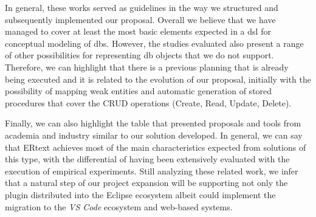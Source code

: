 In general, these works served as guidelines in the way we structured and subsequently implemented our proposal.
Overall we believe that we have managed to cover at least the most basic elements expected in a \ac{dsl} for conceptual modeling of \acp{db}.
However, the studies evaluated also present a range of other possibilities for representing \ac{db} objects that we do not support.
Therefore, we can highlight that there is a previous planning that is already being executed and it is related to the evolution of our proposal, initially with the possibility of mapping weak entities and automatic generation of stored procedures that cover the CRUD operations (Create, Read, Update, Delete).

Finally, we can also highlight the table that presented proposals and tools from academia and industry similar to our solution developed.
In general, we can say that ERtext achieves most of the main characteristics expected from solutions of this type, with the differential of having been extensively evaluated with the execution of empirical experiments.
Still analyzing these related work, we infer that a natural step of our project expansion will be supporting not only the plugin distributed into the Eclipse ecosystem albeit could implement the migration to the \textit{VS Code} ecosystem and web-based systems.
